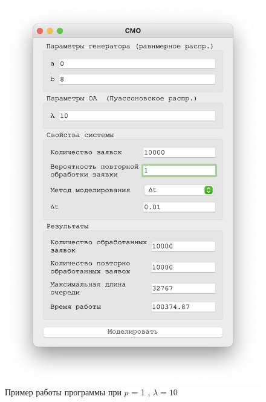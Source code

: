 \begin{figure}[!htb]
\begin{minipage}{0.55\textwidth}
      \includegraphics[width=1\linewidth]{10-1-t}
    \end{minipage}
    \caption{Пример работы программы при $p$ = 1 , $\lambda = 10$}
 \end{figure}

